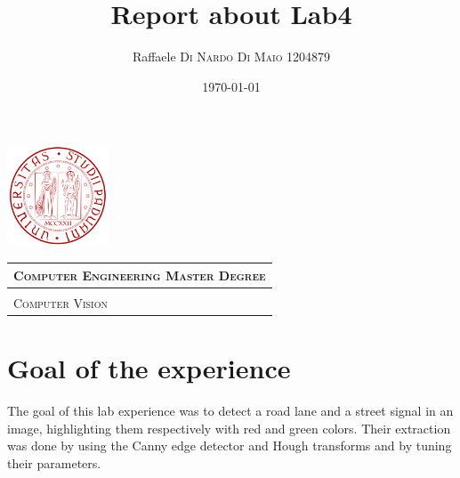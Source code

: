 \documentclass{article}
\title{\textbf{Report about Lab4}} %
\author{Raffaele \textsc{Di Nardo Di Maio} 1204879} %
\date{\today}
\begin{document}
\begin{minipage}{.20\textwidth}
  \includegraphics[height=3cm]{../Icon4}
\end{minipage}\begin{minipage}{.20\textwidth}
  \begin{table}[H]
  \begin{tabular}{l}
  \scshape{\Large{Computer Engineering Master Degree}} \\
  \hline \\
  \scshape{\Large{Computer Vision}} \\
  \end{tabular}
  \end{table}
\end{minipage}
{\let\newpage\relax\maketitle}

\section{Goal of the experience}
The goal of this lab experience was to detect a road lane and a street signal in an image, highlighting them respectively with red and green colors. Their extraction was done by using the Canny edge detector and Hough transforms and by tuning their parameters.
\end{document}
